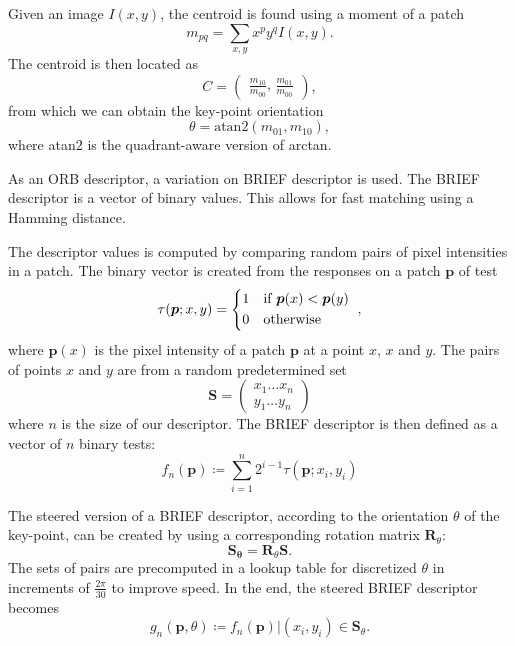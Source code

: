 Given an image $I(x,y)$, the centroid is found using a moment of a patch
\begin{equation}
    m_{pq}=\sum_{x,y} x^p y^q I(x,y).
\end{equation}
The centroid is then located as
\begin{equation}
    C =
    \begin{pmatrix}
        \frac{m_{10}}{m_{00}} \text{, } \frac{m_{01}}{m_{00}}
    \end{pmatrix},
\end{equation}
from which we can obtain the key-point orientation
\begin{equation}
    \theta = \text{atan}2(m_{01},m_{10}),
\end{equation}
where atan$2$ is the quadrant-aware version of arctan.

As an ORB descriptor, a variation on BRIEF descriptor is used. The BRIEF descriptor is a vector of binary values. This allows for fast matching using a Hamming distance.

The descriptor values is computed by comparing random pairs of pixel intensities in a patch. The binary vector is created from the responses on a patch $\boldsymbol{p}$ of test
\begin{equation}
    \tau(\boldsymbol{p};x,y)=
    \begin{cases*}
        1 & if $\boldsymbol{p}(x) < \boldsymbol{p}(y)$ \\
        0 & otherwise
    \end{cases*}, 
\end{equation}
where $\boldsymbol{p}(x)$ is the pixel intensity of a patch $\boldsymbol{p}$ at a point $x$, $x$ and $y$. The pairs of points $x$ and $y$ are from a random predetermined set
\begin{equation}
    \boldsymbol{S} =
    \begin{pmatrix}
        x_1 \dots x_n \\
        y_1 \dots y_n
    \end{pmatrix} 
\end{equation}
where $n$ is the size of our descriptor. The BRIEF descriptor is then defined as a vector of $n$ binary tests:
\begin{equation}
    f_n(\boldsymbol{p}) \coloneqq \sum_{i=1}^{n} 2^{i-1}\tau(\boldsymbol{p};x_i, y_i)
\end{equation}

The steered version of a BRIEF descriptor, according to the orientation $\theta$ of the key-point, can be created by using a corresponding rotation matrix $\boldsymbol{R}_\theta$:
\begin{equation}
    \boldsymbol{S_\theta} = \boldsymbol{R}_\theta \boldsymbol{S}.
\end{equation}
The sets of pairs are precomputed in a lookup table for discretized $\theta$ in increments of $\frac{2\pi}{30}$ to improve speed. In the end, the steered BRIEF descriptor becomes
\begin{equation}
    g_n(\boldsymbol{p}, \theta) \coloneqq f_n(\boldsymbol{p}) | (x_i, y_i) \in \boldsymbol{S}_\theta.
\end{equation}
